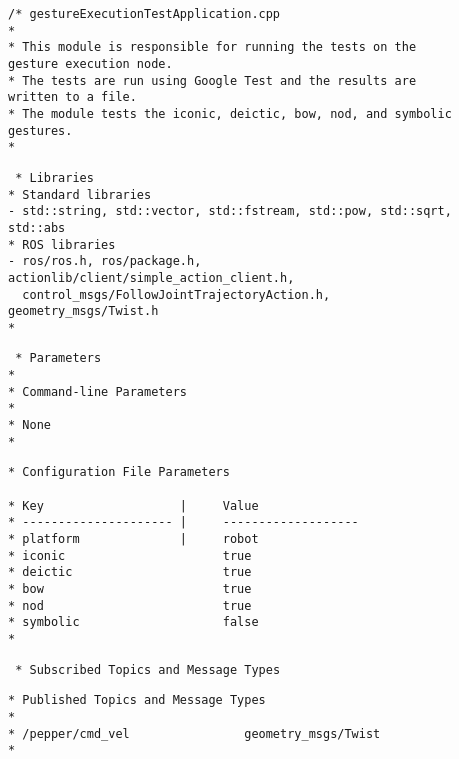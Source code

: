 \documentclass{CSSRforAfrica}
\newcommand{\checkboxChecked}{\fbox{\ding{51}}} %
\begin{document}
\begin{description}

\item[\checkboxChecked] 
 {\small 
\begin{verbatim}
/* gestureExecutionTestApplication.cpp
*
* This module is responsible for running the tests on the gesture execution node.
* The tests are run using Google Test and the results are written to a file. 
* The module tests the iconic, deictic, bow, nod, and symbolic gestures.
*
\end{verbatim}}

\newpage
\item[\checkboxChecked] 
 {\small 
\begin{verbatim}
 * Libraries
* Standard libraries
- std::string, std::vector, std::fstream, std::pow, std::sqrt, std::abs
* ROS libraries
- ros/ros.h, ros/package.h, actionlib/client/simple_action_client.h, 
  control_msgs/FollowJointTrajectoryAction.h, geometry_msgs/Twist.h
*
\end{verbatim}}

\item[\checkboxChecked] 
 {\small 
\begin{verbatim}
 * Parameters
*
* Command-line Parameters
*
* None
*
\end{verbatim}}

\item[\checkboxChecked] 
 {\small 
\begin{verbatim}
* Configuration File Parameters

* Key                   |     Value 
* --------------------- |     -------------------
* platform              |     robot
* iconic                      true
* deictic                     true
* bow                         true
* nod                         true
* symbolic                    false
*
\end{verbatim}}

\item[\checkboxChecked] 
 {\small 
\begin{verbatim}
 * Subscribed Topics and Message Types
\end{verbatim}}

\item[\checkboxChecked] 
 {\small 
\begin{verbatim}                    
* Published Topics and Message Types
* 
* /pepper/cmd_vel                geometry_msgs/Twist
*
\end{verbatim}}


\end{description}
\end{document}
